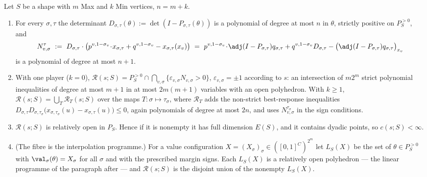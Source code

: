 \begin{theorem}\label{rs:semialg}
Let $S$ be a shape with $m$ Max and $k$ Min vertices, $n=m+k$.
\begin{enumerate}[label=(\alph*),leftmargin=2.2em]
\item For every $\sigma,\tau$ the determinant $D_{\sigma,\tau}(\theta):=
      \det(I-P_{\sigma,\tau}(\theta))$ is a polynomial of degree at most $n$
      in $\theta$, strictly positive on $P_S^{>0}$, and
      \[
        N^{\tau}_{v,\sigma}\ :=\ D_{\sigma,\tau}\cdot
        \bigl(p^{v,1-\sigma_v}\!\cdot\!x_{\sigma,\tau}+q^{v,1-\sigma_v}-x_{\sigma,\tau}(x_v)\bigr)
        \ =\ p^{v,1-\sigma_v}\!\cdot\!\adj(I-P_{\sigma,\tau})q_{\sigma,\tau}
             +q^{v,1-\sigma_v}D_{\sigma,\tau}
             -\bigl(\adj(I-P_{\sigma,\tau})q_{\sigma,\tau}\bigr)_{x_v}
      \]
      is a polynomial of degree at most $n+1$.
\item With one player ($k=0$),
      $\mathcal R(s;S)=P^{>0}_S\cap\bigcap_{v,\sigma}\{\varepsilon_{v,\sigma}
      N_{v,\sigma}>0\}$, $\varepsilon_{v,\sigma}=\pm1$ according to $s$: an
      intersection of $m2^{m}$ strict polynomial inequalities of degree at
      most $m+1$ in at most $2m(m+1)$ variables with an open polyhedron.
      With $k\ge1$, $\mathcal R(s;S)=\bigcup_{T}\mathcal R_T(s;S)$ over the
      maps $T:\sigma\mapsto\tau_\sigma$, where $\mathcal R_T$ adds the
      non-strict best-response inequalities
      $D_{\sigma,\tau}D_{\sigma,\tau_\sigma}
       \bigl(x_{\sigma,\tau_\sigma}(u)-x_{\sigma,\tau}(u)\bigr)\le0$,
      again polynomials of degree at most $2n$, and uses
      $N^{\tau_\sigma}_{v,\sigma}$ in the sign conditions.
\item $\mathcal R(s;S)$ is relatively open in $P_S$. Hence if it is nonempty
      it has full dimension $E(S)$, and it contains dyadic points, so
      $c(s;S)<\infty$.
\item {\rm(The fibre is the interpolation programme.)} For a value
      configuration $X=(X_\sigma)_{\sigma}\in([0,1]^{C})^{2^{m}}$ let
      $L_S(X)$ be the set of $\theta\in P_S^{>0}$ with $\val_\sigma(\theta)
      =X_\sigma$ for all $\sigma$ and with the prescribed margin signs. Each
      $L_S(X)$ is a relatively open polyhedron --- the linear programme of the
      paragraph after  --- and $\mathcal R(s;S)$ is
      the disjoint union of the nonempty $L_S(X)$.
\end{enumerate}
\end{theorem}

